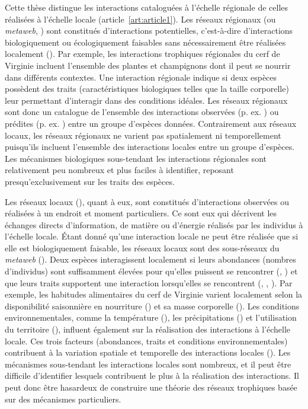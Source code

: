 Cette thèse distingue les interactions cataloguées à l'échelle régionale de
celles réalisées à l'échelle locale (article~\ref{art:article1}). Les réseaux
régionaux (ou \textit{metaweb}, \cite{Pascual2006Ecological}) sont constitués
d'interactions potentielles, c'est-à-dire d'interactions biologiquement ou
écologiquement faisables sans nécessairement être réalisées localement
(\cite{Tylianakis2017Ecological}). Par exemple, les interactions trophiques
régionales du cerf de Virginie incluent l'ensemble des plantes et champignons
dont il peut se nourrir dans différents contextes. Une interaction régionale
indique si deux espèces possèdent des traits (caractéristiques biologiques
telles que la taille corporelle) leur permettant d'interagir dans des conditions
idéales. Les réseaux régionaux sont donc un catalogue de l'ensemble des
interactions observées (p. ex. \cite{Maiorano2020Tetraeu}) ou prédites (p. ex.
\cite{Strydom2022Food}) entre un groupe d'espèces données. Contrairement aux
réseaux locaux, les réseaux régionaux ne varient pas spatialement ni
temporellement puisqu'ils incluent l'ensemble des interactions locales entre un
groupe d'espèces. Les mécanismes biologiques sous-tendant les interactions
régionales sont relativement peu nombreux et plus faciles à identifier, reposant
presqu'exclusivement sur les traits des espèces. 

Les réseaux locaux (\cite{Poisot2012Dissimilarity}), quant à eux, sont
constitués d'interactions observées ou réalisées à un endroit et moment
particuliers. Ce sont eux qui décrivent les échanges directs d'information, de
matière ou d'énergie réalisés par les individus à l'échelle locale. Étant donné
qu'une interaction locale ne peut être réalisée que si elle est biologiquement
faisable, les réseaux locaux sont des sous-réseaux du \textit{metaweb}
(\cite{Saravia2022Ecological}). Deux espèces interagissent localement si leurs
abondances (nombres d'individus) sont suffisamment élevées pour qu'elles
puissent se rencontrer (\cite{Canard2012Emergence}, \cite{Canard2014Empirical})
et que leurs traits supportent une interaction lorsqu'elles se rencontrent
(\cite{Bolnick2011Why}, \cite{Gravel2013Inferring}, \cite{Stouffer2011Role}).
Par exemple, les habitudes alimentaires du cerf de Virginie varient localement
selon la disponibilité saisonnière en nourriture (\cite{Short1975Nutrition}) et
sa masse corporelle (\cite{Luna2013Influence}). Les conditions
environnementales, comme la température (\cite{Angilletta2004Temperature}), les
précipitations (\cite{Woodward2012Climate}) et l'utilisation du territoire
(\cite{Tylianakis2007Habitat}), influent également sur la réalisation des
interactions à l'échelle locale. Ces trois facteurs (abondances, traits et
conditions environnementales) contribuent à la variation spatiale et temporelle
des interactions locales (\cite{Poisot2015Species}). Les mécanismes sous-tendant
les interactions locales sont nombreux, et il peut être difficile d'identifier
lesquels contribuent le plus à la réalisation des interactions. Il peut donc
être hasardeux de construire une théorie des réseaux trophiques basée sur des
mécanismes particuliers.  

